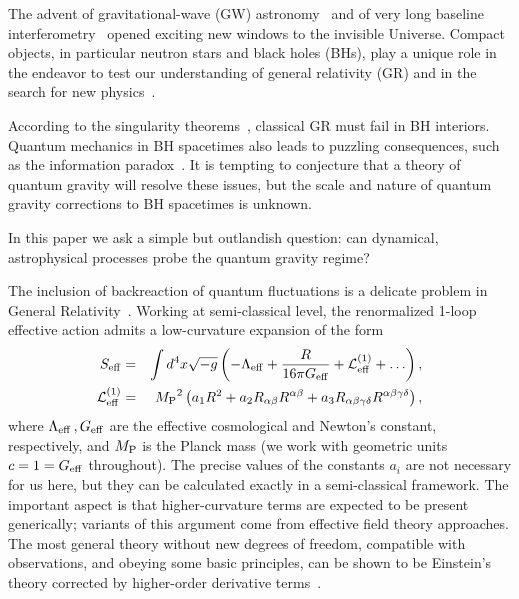 \documentclass[floats,floatfix,showpacs,amssymb,prd,twocolumn,superscriptaddress,nofootinbib,nolongbibliography,reprint]{revtex4-2}
\newcommand{\beq}{\begin{eqnarray}}
\newcommand{\eeq}{\end{eqnarray}}
\begin{document}
 The advent of gravitational-wave (GW) astronomy~\cite{LIGOScientific:2016aoc,Abbott:2020niy} and of very long baseline interferometry~\cite{EventHorizonTelescope:2019dse,GRAVITY:2020gka} opened
exciting new windows to the invisible Universe.
Compact objects, in particular neutron stars and black holes (BHs), play a unique role in the endeavor to test our understanding of general relativity (GR) and in the search for new physics~\cite{Berti:2015itd,Barack:2018yly,Berti:2018cxi,Berti:2018vdi,Cardoso:2019rvt,Bertone:2018krk,Brito:2015oca}. 

According to the singularity theorems~\cite{Penrose:1964wq,Penrose:1969pc}, classical GR must fail in BH interiors. Quantum mechanics in BH spacetimes also leads to puzzling consequences, such as the information paradox~\cite{Unruh:2017uaw,Mathur:2005zp,Giddings:2017mym}.
It is tempting to conjecture that a theory of quantum gravity will resolve these issues, but the scale and nature of quantum gravity corrections to BH spacetimes is unknown. 


In this paper we ask a simple but outlandish question: can dynamical, astrophysical processes probe the quantum gravity regime? 

The inclusion of backreaction of quantum fluctuations is a delicate problem in General Relativity~\cite{Birrell:1982ix}. Working at semi-classical level, the renormalized 1-loop effective action admits a low-curvature expansion of the form~\cite{Birrell:1982ix,Parker:2008,Burgess:2003jk}
%
\beq
S_{\rm eff}&=&\int d^4x \sqrt{-g}\left(-\Lambda_{\rm eff}+\frac{R}{16\pi G_{\rm eff}}+{\cal L}_{\rm eff}^{(1)}+\ldots\right),\\
%
{\cal L}_{\rm eff}^{(1)}&=&{M_{\rm P}}^2\left(a_1 R^2+a_2R_{\alpha\beta}R^{\alpha\beta}+a_3R_{\alpha\beta\gamma\delta}R^{\alpha\beta\gamma\delta}\right),
\eeq
%
where $\Lambda_{\rm eff}\,,G_{\rm eff}$ are the effective cosmological and Newton's constant, respectively, and $M_{\rm P}$ is the Planck mass (we work with geometric units  $c=1=G_{\rm eff}$ throughout).
The precise values of the constants $a_i$ are not necessary for us here, but they can be calculated exactly in a semi-classical framework. The important aspect is that higher-curvature terms are expected to be present generically; variants of this argument come from effective field theory approaches. The most general theory without new degrees of freedom, compatible with observations, and obeying some basic principles, can be shown to be Einstein's theory corrected by higher-order derivative terms~\cite{Birrell:1982ix,Parker:2008,Burgess:2003jk,Endlich:2017tqa}.
\end{document}
